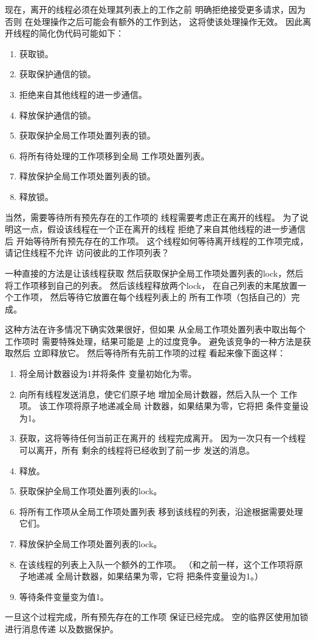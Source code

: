 {	现在，离开的线程必须在处理其列表上的工作之前
	明确拒绝接受更多请求，因为否则
	在处理操作之后可能会有额外的工作到达，
	这将使该处理操作无效。
	因此离开线程的简化伪代码可能如下：

	\begin{enumerate}
	\item	获取锁。
	\item	获取保护通信的锁。
	\item	拒绝来自其他线程的进一步通信。
	\item	释放保护通信的锁。
	\item	获取保护全局工作项处置列表的锁。
	\item	将所有待处理的工作项移到全局
		工作项处置列表。
	\item	释放保护全局工作项处置列表的锁。
	\item	释放锁。
	\end{enumerate}

	当然，需要等待所有预先存在的工作项的
	线程需要考虑正在离开的线程。
	为了说明这一点，假设该线程在一个正在离开的线程
	拒绝了来自其他线程的进一步通信后
	开始等待所有预先存在的工作项。
	这个线程如何等待离开线程的工作项完成，
	请记住线程不允许
	访问彼此的工作项列表？

	一种直接的方法是让该线程获取
	然后获取保护全局工作项处置列表的lock，然后
	将工作项移到自己的列表。
	然后该线程释放两个lock，
	在自己列表的末尾放置一个工作项，
	然后等待它放置在每个线程列表上的
	所有工作项（包括自己的）完成。

	这种方法在许多情况下确实效果很好，但如果
	从全局工作项处置列表中取出每个工作项时
	需要特殊处理，结果可能是
	上的过度竞争。
	避免该竞争的一种方法是获取然后
	立即释放它。
	然后等待所有先前工作项的过程
	看起来像下面这样：

	\begin{enumerate}
	\item	将全局计数器设为1并将条件
		变量初始化为零。
	\item	向所有线程发送消息，使它们原子地
		增加全局计数器，然后入队一个
		工作项。
		该工作项将原子地递减全局
		计数器，如果结果为零，它将把
		条件变量设为1。
	\item	获取，这将等待任何当前正在离开的
		线程完成离开。
		因为一次只有一个线程可以离开，所有
		剩余的线程将已经收到了前一步
		发送的消息。
	\item	释放。
	\item	获取保护全局工作项处置列表的lock。
	\item	将所有工作项从全局工作项处置列表
		移到该线程的列表，沿途根据需要处理它们。
	\item	释放保护全局工作项处置列表的lock。
	\item	在该线程的列表上入队一个额外的工作项。
		（和之前一样，这个工作项将原子地递减
		全局计数器，如果结果为零，它将
		把条件变量设为1。）
	\item	等待条件变量变为值1。
	\end{enumerate}

	一旦这个过程完成，所有预先存在的工作项
	保证已经完成。
	空的临界区使用加锁进行消息传递
	以及数据保护。
}\QuickQuizEnd

